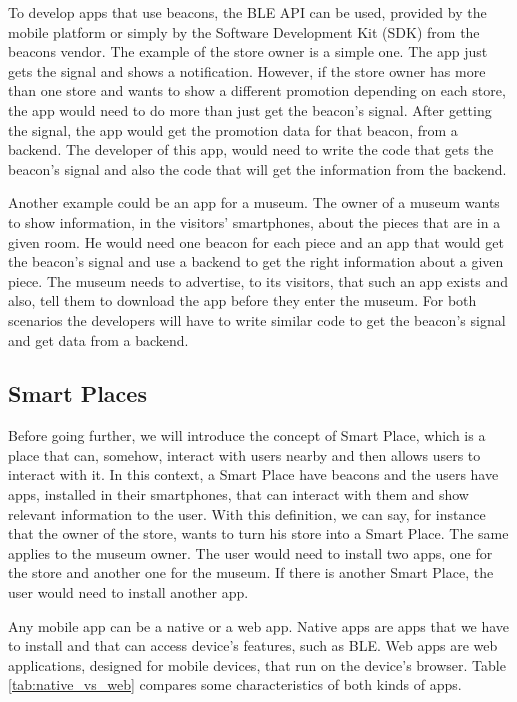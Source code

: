 To develop apps that use beacons, the 
BLE API can be used, provided by the 
mobile platform or simply by the Software
Development Kit (SDK) from the 
beacons vendor. The example of the store owner is a
simple one. The app just gets the signal and shows a 
notification. However, if the store owner has more than
one store and wants to show a different promotion depending
on each store, the app would need to do more than just get
the beacon's signal. After getting the signal, the app
would get the promotion data for that beacon, from a 
backend. The developer of this app, would need to
write the code that gets the beacon's signal and also
the code that will get the information from the backend.

Another example could be an app for a museum. The owner
of a museum wants to show information, in the 
visitors' smartphones, about the pieces that are in a given
room. He would need one beacon for each piece and an app
that would get the beacon's signal and use a
backend to get the right information about a given piece.
The museum needs to advertise, to its visitors, that such
an app exists and also, tell them to download the app
before they enter the museum. For both scenarios the developers will have to write similar code to get
the beacon's signal and get data from a backend.

\subsection{Smart Places}
\label{sub:smart_places}
Before going further, we will introduce the concept of
Smart Place, which is a place that can, somehow,
interact with users nearby and then allows 
users to interact 
with it.
In this context, a Smart Place have beacons and the users
have apps, installed in their smartphones, 
that can interact
with them and show relevant information to the user.
With this definition, we can say, for instance
that the owner of the store, wants to
turn his store into a Smart Place.
The same applies to the museum owner.
The user would need to install two apps, one for the
store and another one for the museum.
If there is another Smart Place, the user would need to
install another app.

Any mobile app can be a native or a web app. Native apps
are apps that we have to install and that can access
device's features, such as BLE. Web apps are web
applications, designed for mobile devices, that run
on the device's browser. Table \ref{tab:native_vs_web}
compares some characteristics of both kinds of apps.


